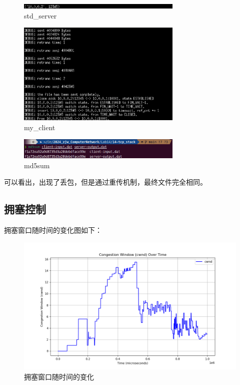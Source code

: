 \documentclass[UTF8]{report}
\begin{document}
\begin{enumerate}
    \begin{figure}[H]
        \centering
        \includegraphics[width=0.7\textwidth]{std_server_my_client_h1.png}
        \caption{std\_server}
    \end{figure}

    \begin{figure}[H]
        \centering
        \includegraphics[width=0.7\textwidth]{std_server_my_client_h2.png}
        \caption{my\_client}
    \end{figure}

    \begin{figure}[H]
        \centering
        \includegraphics[width=0.7\textwidth]{std_server_my_client_md5sum.png}
        \caption{md5sum}
    \end{figure}

    可以看出，出现了丢包，但是通过重传机制，最终文件完全相同。
\end{enumerate}

\subsection{拥塞控制}

拥塞窗口随时间的变化图如下：

\begin{figure}[H]
    \centering
    \includegraphics[width=\textwidth]{cwnd_plot.png}
    \caption{拥塞窗口随时间的变化}
\end{figure}
\end{document}
